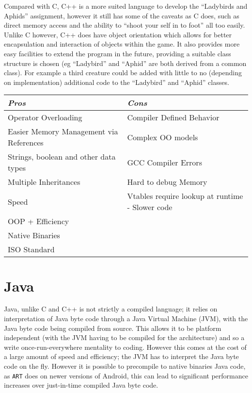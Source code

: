 \documentclass[10pt]{article}
\begin{document}
    Compared with C, C++ is a more suited language to develop the ``Ladybirds and Aphids'' assignment, however it still has some of the caveats as C does, such as direct memory access and the ability to ``shoot your self in to foot'' all too easily. Unlike C however, C++ does have object orientation which allows for better encapsulation and interaction of objects within the game. It also provides more easy facilities to extend the program in the future, providing a suitable class structure is chosen (eg ``Ladybird'' and ``Aphid'' are both derived from a common class). For example a third creature could be added with little to no (depending on implementation) additional code to the ``Ladybird'' and ``Aphid'' classes. 

    \begin{tabular}{| p{7cm} | p{7cm} |}
      \hline
      \emph{Pros} & \emph{Cons} \\ \hline \hline

      Operator Overloading & Compiler Defined Behavior \\ \hline
      Easier Memory Management via References & Complex OO models \\ \hline
      Strings, boolean and other data types & GCC Compiler Errors \\ \hline
      Multiple Inheritances & Hard to debug Memory \\ \hline
      Speed & Vtables require lookup at runtime - Slower code \\ \hline
      OOP + Efficiency & \\ \hline
      Native Binaries & \\ \hline
      ISO Standard & \\ \hline
    \end{tabular}
    
    \newpage

  \section{Java}
    Java, unlike C and C++ is not strictly a compiled language; it relies on interpretation of Java byte code through a Java Virtual Machine (JVM), with the Java byte code being compiled from source. This allows it to be platform independent (with the JVM having to be compiled for the architecture) and so a write once-run-everywhere mentality to coding. However this comes at the cost of a large amount of speed and efficiency; the JVM has to interpret the Java byte code on the fly. However it is possible to precompile to native binaries Java code, as \texttt{ART} does on newer versions of Android, this can lead to significant performance increases over just-in-time compiled Java byte code\cite{androidART}.
\end{document}
